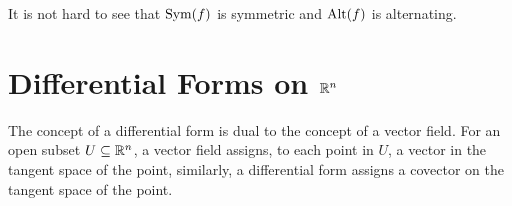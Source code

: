 It is not hard to see that $\operatorname{Sym}(f)$ is symmetric and $\operatorname{Alt}(f)$ is alternating.

\section{Differential Forms on \texorpdfstring{$\mathbb{R}^n$}{}}

The concept of a differential form is dual to the concept of a vector field. For an open subset $U\subseteq\mathbb{R}^n$, a vector field assigns, to each point in $U$, a vector in the tangent space of the point, similarly, a differential form assigns a covector on the tangent space of the point.